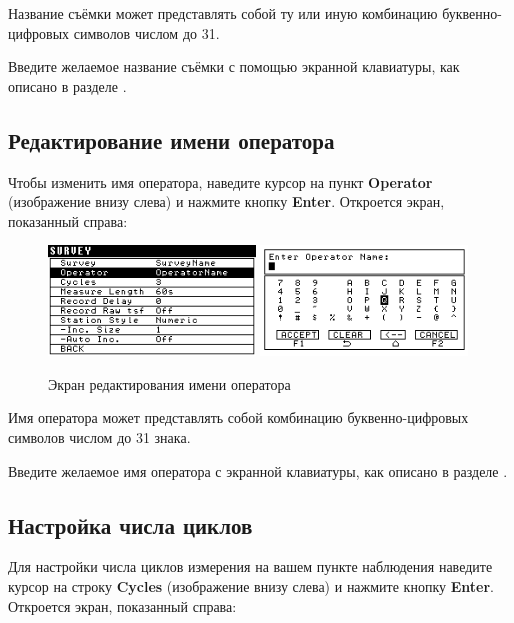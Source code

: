Название съёмки может представлять собой ту или иную комбинацию
буквенно-цифровых символов числом до 31.

Введите желаемое название съёмки с помощью экранной клавиатуры, как описано
в разделе .

\subsection{Редактирование имени оператора}

Чтобы изменить имя оператора, наведите курсор на пункт \textbf{Operator}
(изображение внизу слева) и нажмите кнопку \textbf{Enter}. Откроется экран,
показанный справа:

\begin{figure}[H]
  \centering
  \includegraphics[width=0.49\textwidth]{figures/the_operator_name_editing_screen_1}
  \includegraphics[width=0.49\textwidth]{figures/the_operator_name_editing_screen_2}
  \caption{Экран редактирования имени оператора}
  \label{fig:the_operator_name_editing_screen}
\end{figure}

Имя оператора может представлять собой комбинацию буквенно-цифровых
символов числом до 31 знака.

Введите желаемое имя оператора с экранной клавиатуры, как описано в разделе
.

\subsection{Настройка числа циклов}
\label{subsec:adjusting_the_number_of_cycles}

Для настройки числа циклов измерения на вашем пункте наблюдения наведите курсор
на строку \textbf{Cycles} (изображение внизу слева) и нажмите кнопку
\textbf{Enter}.  Откроется экран, показанный справа:

